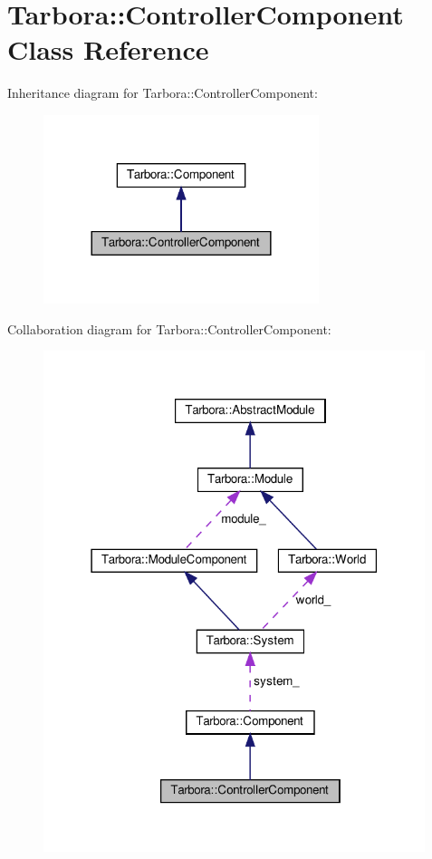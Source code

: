 \hypertarget{classTarbora_1_1ControllerComponent}{}\section{Tarbora\+:\+:Controller\+Component Class Reference}
\label{classTarbora_1_1ControllerComponent}


Inheritance diagram for Tarbora\+:\+:Controller\+Component\+:\nopagebreak
\begin{figure}[H]
\begin{center}
\leavevmode
\includegraphics[width=228pt]{classTarbora_1_1ControllerComponent__inherit__graph}
\end{center}
\end{figure}


Collaboration diagram for Tarbora\+:\+:Controller\+Component\+:\nopagebreak
\begin{figure}[H]
\begin{center}
\leavevmode
\includegraphics[width=316pt]{classTarbora_1_1ControllerComponent__coll__graph}
\end{center}
\end{figure}
